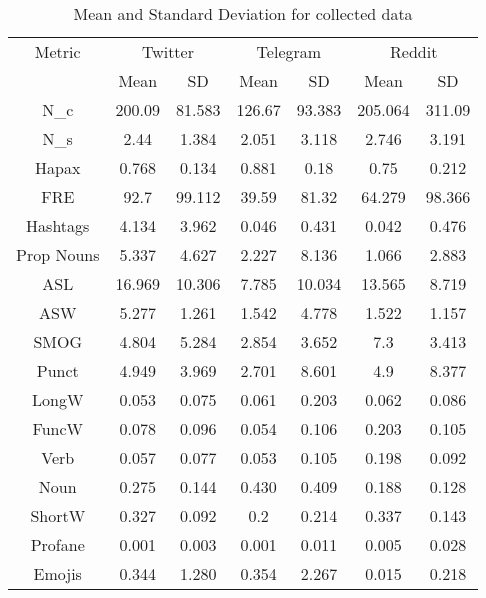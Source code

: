 \begin{table}[ht]%
	\centering
	\caption{Mean and Standard Deviation for collected data}%
	\label{tab:collectedDataMeanAndSD}%
		\begin{tabular}{ c  c  c  c  c  c  c }%
			\toprule
			Metric & \multicolumn{2}{c}{Twitter} & \multicolumn{2}{c}{Telegram} & \multicolumn{2}{c}{Reddit}\\
			\cline{2-7}
			& Mean & SD & Mean & SD & Mean & SD \\
			\hline
			N\_c & 200.09 & 81.583	& 126.67 & 93.383 & 205.064 & 311.09 \\
			N\_s & 2.44 & 1.384 & 2.051 & 3.118 & 2.746 & 3.191\\
			Hapax & 0.768 & 0.134 & 0.881 & 0.18 & 0.75 & 0.212\\
			FRE & 92.7 & 99.112 & 39.59 & 81.32 & 64.279 & 98.366\\
			Hashtags & 4.134 & 3.962 & 0.046 & 0.431 & 0.042 & 0.476\\
			Prop Nouns & 5.337 & 4.627 & 2.227 & 8.136 & 1.066 & 2.883\\
			ASL & 16.969 & 10.306 & 7.785 & 10.034 & 13.565 & 8.719\\
			ASW & 5.277 & 1.261 & 1.542 & 4.778 & 1.522 & 1.157\\
			SMOG & 4.804 & 5.284 & 2.854 & 3.652 & 7.3 & 3.413\\
			Punct & 4.949 & 3.969 & 2.701 & 8.601 & 4.9 & 8.377\\
			LongW & 0.053 & 0.075 & 0.061 & 0.203 & 0.062 & 0.086\\
			FuncW & 0.078 & 0.096 & 0.054 & 0.106 & 0.203 & 0.105\\
			Verb & 0.057 & 0.077 & 0.053 & 0.105 & 0.198 & 0.092\\
			Noun & 0.275 & 0.144 & 0.430 & 0.409 & 0.188 & 0.128\\
			ShortW & 0.327 & 0.092 & 0.2 & 0.214 & 0.337 & 0.143\\
			Profane & 0.001 & 0.003 & 0.001 & 0.011 & 0.005 & 0.028\\
			Emojis & 0.344 & 1.280 & 0.354 & 2.267 & 0.015 & 0.218\\
			\bottomrule
		\end{tabular}%
\end{table}

